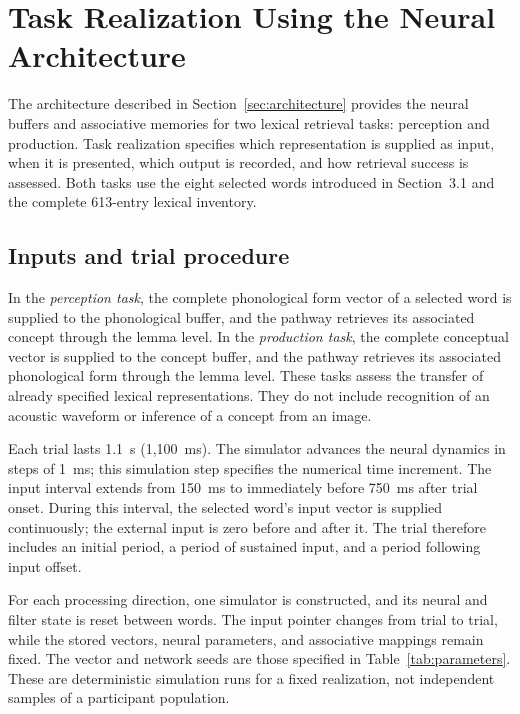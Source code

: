 \section{Task Realization Using the Neural Architecture}
\label{sec:tasks}
The architecture described in Section~\ref{sec:architecture} provides the neural buffers and associative memories for two lexical retrieval tasks: perception and production. Task realization specifies which representation is supplied as input, when it is presented, which output is recorded, and how retrieval success is assessed. Both tasks use the eight selected words introduced in Section~3.1 and the complete 613-entry lexical inventory.

\subsection{Inputs and trial procedure}
\label{sec:task-procedure}
In the \emph{perception task}, the complete phonological form vector of a selected word is supplied to the phonological buffer, and the pathway retrieves its associated concept through the lemma level. In the \emph{production task}, the complete conceptual vector is supplied to the concept buffer, and the pathway retrieves its associated phonological form through the lemma level. These tasks assess the transfer of already specified lexical representations. They do not include recognition of an acoustic waveform or inference of a concept from an image.

Each trial lasts 1.1~s (1,100~ms). The simulator advances the neural dynamics in steps of 1~ms; this simulation step specifies the numerical time increment. The input interval extends from 150~ms to immediately before 750~ms after trial onset. During this interval, the selected word's input vector is supplied continuously; the external input is zero before and after it. The trial therefore includes an initial period, a period of sustained input, and a period following input offset.

For each processing direction, one simulator is constructed, and its neural and filter state is reset between words. The input pointer changes from trial to trial, while the stored vectors, neural parameters, and associative mappings remain fixed. The vector and network seeds are those specified in Table~\ref{tab:parameters}. These are deterministic simulation runs for a fixed realization, not independent samples of a participant population.

